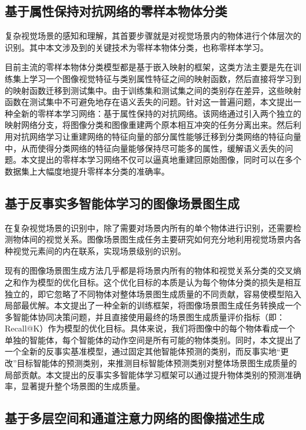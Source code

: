\subsection{基于属性保持对抗网络的零样本物体分类}
复杂视觉场景的感知和理解，其首要步骤就是对视觉场景内的物体进行个体层次的识别。其中本文涉及到的关键技术为零样本物体分类，也称零样本学习。

目前主流的零样本物体分类模型都是基于嵌入映射的框架，这类方法主要是先在训练集上学习一个图像视觉特征与类别属性特征之间的映射函数，然后直接将学习到的映射函数迁移到测试集中。由于训练集和测试集之间的类别存在差异，这些映射函数在测试集中不可避免地存在语义丢失的问题。针对这一普遍问题，本文提出一种全新的零样本学习网络：基于属性保持的对抗网络。该网络通过引入两个独立的映射网络分支，将图像分类和图像重建两个原本相互冲突的任务分离出来。然后利用对抗网络学习让重建网络的特征向量的部分属性能够迁移到分类网络的特征向量中，从而使得分类网络的特征向量能够保持尽可能多的属性，缓解语义丢失的问题。本文提出的零样本学习网络不仅可以逼真地重建回原始图像，同时可以在多个数据集上大幅度地提升零样本分类的准确率。

\subsection{基于反事实多智能体学习的图像场景图生成}
在复杂视觉场景的识别中，除了需要对场景内所有的单个物体进行识别，还需要检测物体间的视觉关系。图像场景图生成任务主要研究如何充分地利用视觉场景内各种视觉元素间的内在联系，实现场景级别的识别。

现有的图像场景图生成方法几乎都是将场景内所有的物体和视觉关系分类的交叉熵之和作为模型的优化目标。这个优化目标的本质是认为每个物体分类的损失是相互独立的，即它忽略了不同物体对整体场景图生成质量的不同贡献，容易使模型陷入局部最优解。本文提出了一种全新的训练框架，将图像场景图生成任务转换成一个多智能体协同决策问题，并且直接使用最终的场景图生成质量评价指标（即：Recall@K）作为模型的优化目标。具体来说，我们将图像中的每个物体看成一个单独的智能体，每个智能体的动作空间是所有可能的物体类别。同时，本文提出了一个全新的反事实基准模型，通过固定其他智能体预测的类别，而反事实地“更改”目标智能体的预测类别，来推测目标智能体预测类别对整体场景图生成质量的局部贡献。本文提出的反事实多智能体学习框架可以通过提升物体类别的预测准确率，显著提升整个场景图的生成质量。


\subsection{基于多层空间和通道注意力网络的图像描述生成}

